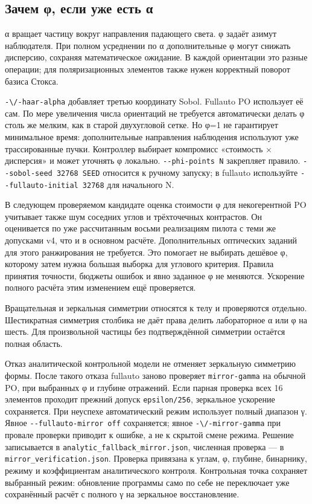 \subsection{Зачем φ, если уже есть
α}\label{ux437ux430ux447ux435ux43c-ux3c6-ux435ux441ux43bux438-ux443ux436ux435-ux435ux441ux442ux44c-ux3b1}

α вращает частицу вокруг направления падающего света. φ задаёт азимут
наблюдателя. При полном усреднении по α дополнительные φ могут снижать
дисперсию, сохраняя математическое ожидание. В каждой ориентации это
разные операции; для поляризационных элементов также нужен корректный
поворот базиса Стокса.

\nolinkurl{-\/-haar-alpha} добавляет третью координату Sobol. Fullauto PO
использует её сам. По мере увеличения числа ориентаций не требуется
автоматически делать φ столь же мелким, как в старой двухугловой сетке.
Но φ=1 не гарантирует минимальное время: дополнительные направления
наблюдения используют уже трассированные пучки. Контроллер выбирает
компромисс «стоимость × дисперсия» и может уточнять φ локально.
\texttt{-\/-phi-points\ N} закрепляет правило.
\texttt{-\/-sobol-seed\ 32768\ SEED} относится к ручному запуску; в
fullauto используйте \texttt{-\/-fullauto-initial\ 32768} для начального
N.

В следующем проверяемом кандидате оценка стоимости φ для некогерентной
PO учитывает также шум соседних углов и трёхточечных контрастов. Он
оценивается по уже рассчитанным восьми реализациям пилота с теми же
допусками v4, что и в основном расчёте. Дополнительных оптических
заданий для этого ранжирования не требуется. Это помогает не выбирать
дешёвое φ, которому затем нужна большая выборка для углового критерия.
Правила принятия точности, бюджеты ошибок и явно заданное φ не меняются.
Ускорение полного расчёта этим изменением ещё проверяется.

Вращательная и зеркальная симметрии относятся к телу и проверяются
отдельно. Шестикратная симметрия столбика не даёт права делить
лабораторное α или φ на шесть. Для произвольной частицы без
подтверждённой симметрии остаётся полная область.

Отказ аналитической контрольной модели не отменяет зеркальную симметрию
формы. После такого отказа fullauto заново проверяет
\texttt{mirror-gamma} на обычной PO, при выбранных φ и глубине
отражений. Если парная проверка всех 16 элементов проходит прежний
допуск \nolinkurl{epsilon/256}, зеркальное ускорение сохраняется. При
неуспехе автоматический режим использует полный диапазон γ. Явное
\texttt{-\/-fullauto-mirror\ off} сохраняется; явное
\nolinkurl{-\/-mirror-gamma} при провале проверки приводит к ошибке, а не к
скрытой смене режима. Решение записывается в
\nolinkurl{analytic_fallback_mirror.json}, численная проверка --- в
\nolinkurl{mirror_verification.json}. Проверка привязана к углам, φ,
глубине, бинарнику, режиму и коэффициентам аналитического контроля.
Контрольная точка сохраняет выбранный режим: обновление программы само
по себе не переключает уже сохранённый расчёт с полного γ на зеркальное
восстановление.

